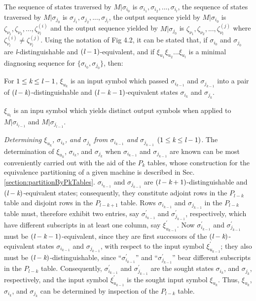The sequence of states traversed by $ M|\sigma_{i_{0}}$ is $\sigma_{i_{1}}, \sigma_{i_{2}}, ..., \sigma_{i_{l}} $, the sequence of states traversed by $ M|\sigma_{j_{0}} $ is $\sigma_{j_{1}}, \sigma_{j_{2}}, ..., \sigma_{j_{l}} $, the output sequence yield by $ M|\sigma_{i_{0}}$ is $\zeta_{\nu_{1}}, \zeta_{\nu_{2}}, ..., \zeta^{(i)}_{\nu_{l}} $ and the output sequence yielded by $ M|\sigma_{j_{0}} $ is $\zeta_{\nu_{1}}, \zeta_{\nu_{2}}, ..., \zeta^{(j)}_{\nu_{l}} $ where $ \zeta^{(i)}_{\nu_{l}} \neq \zeta^{(j)}_{\nu_{l}} $. Using the notation of Fig 4.2, it can be stated that, if $\sigma_{i_{0}}$ and $\sigma_{j_{0}}$ are \emph{l}-distinguishable and $(\emph{l}-1)$-equivalent, and if $\xi_{u_{1}}\xi_{u_{2}}...\xi_{u_{l}}$ is a minimal diagnosing sequence for $\{  \sigma_{i_{0}}, \sigma_{j_{0}}\}$, then: \begin{inparaenum}[(1) ]
    \item For $ 1 \leq \emph{k} \leq \emph{l} - 1$, $\xi_{u_{k}}$ is an input symbol which passed $\sigma_{i_{k-1}}$ and $\sigma_{j_{k-1}}$ into a pair of $(\emph{l} - \emph{k})$-distinguishable and $(\emph{l} - \emph{k} - 1)$-equivalent states $\sigma_{i_{k}}$ and $\sigma_{j_{k}}$.
    \item $\xi_{u_{l}}$ is an inpu symbol which yields distinct output symbols when applied to $ M|\sigma_{i_{l-1}}$ and $ M|\sigma_{j_{l-1}}$.
\end{inparaenum}

\emph{Determining $\xi_{u_{k}}$, $\sigma_{i_{k}}$, and  $\sigma_{j_{k}}$ from $\sigma_{i_{k-1}}$ and $\sigma_{j_{k-1}}$ } $(1 \leq \emph{k} \leq \emph{l} - 1)$. The determination of $\xi_{u_{k}}$, $\sigma_{i_{k}}$, and  $\sigma_{j_{k}}$ when $\sigma_{i_{k-1}}$ and $\sigma_{j_{k-1}}$ are known can be most conveniently carried out with the aid of the $P_k$ tables, whose construction for the equivalence partitioning of a given machine is described in Sec. \ref{section:partitionByPkTables}. $\sigma_{i_{k-1}}$ and $\sigma_{j_{k-1}}$ are $(\emph{l} - \emph{k} + 1)$-distinguishable and $(\emph{l}-\emph{k})$-equivalent states; consequently, they constitute adjoint rows in the $P_{l-k}$ table and disjoint rows in the $P_{l-k+1}$ table. Rows $\sigma_{i_{k-1}}$ and $\sigma_{j_{k-1}}$ in the $P_{l-k}$ table must, therefore exhibit two entries, say $\sigma^{'}_{i_{k-1}}$ and $\sigma^{'}_{j_{k-1}}$, respectively, which have different subscripts in at least one column, say $\xi^{'}_{u_{k-1}}$. Now $\sigma^{'}_{i_{k-1}}$ and $\sigma^{'}_{j_{k-1}}$ must be $(\emph{l}-\emph{k}-1)$-equivalent, since they are first successors of the  $(\emph{l}-\emph{k})$-equivalent states $\sigma_{i_{k-1}}$ and $\sigma_{j_{k-1}}$, with respect to the input symbol $\xi^{'}_{u_{k-1}}$; they also must be $(\emph{l} - \emph{k})$-distinguishable, since ``$\sigma^{'}_{i_{k-1}}$'' and ``$\sigma^{'}_{j_{k-1}}$'' bear different subscripts in the $P_{l-k}$ table. Consequently, $\sigma^{'}_{i_{k-1}}$ and $\sigma^{'}_{j_{k-1}}$ are the sought states $\sigma_{i_{k}}$, and  $\sigma_{j_{k}}$, respectively, and the input symbol $\xi^{'}_{u_{k-1}}$ is the sought input symbol $\xi_{u_{k}}$. Thus, $\xi_{u_{k}}$, $\sigma_{i_{k}}$, and  $\sigma_{j_{k}}$ can be determined by inspection of the $P_{l-k}$ table.

